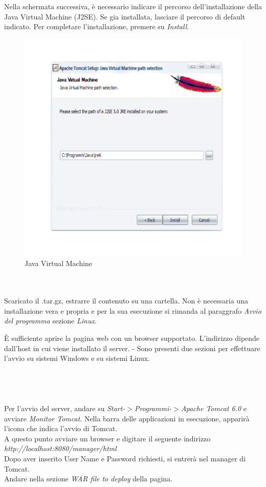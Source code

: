 Nella schermata successiva, \`e necessario indicare il percorso dell'installazione della Java Virtual Machine (J2SE). Se gia installata, lasciare il percorso di default
indicato.
Per completare l'installazione, premere su \textit{Install}.

\begin{figure}[!ht]
\centering
\includegraphics[scale=0.7]{images/InstallTomcat4.png}
\caption{Java Virtual Machine}
\end{figure} 

\\
\\
Scaricato il .tar.gz, estrarre il contenuto su una cartella.
Non \`e necessaria una installazione vera e propria e per la sua esecuzione si rimanda al paraggrafo \textit{Avvio del programma} sezione \textit{Linux}.

\`E sufficiente aprire la pagina web con un browser supportato. L'indirizzo dipende dall'host in cui viene installato il server.
-
Sono presenti due sezioni per effettuare l'avvio su sistemi Windows e su sistemi Linux.\\
\\\\
\\
\\
Per l'avvio del server, andare su \textit{Start-$ > $Programmi-$ > $Apache Tomcat 6.0} e avviare \textit{Monitor Tomcat}.
Nella barra delle applicazioni in esecuzione, apparir\`a l'icona che indica l'avvio di Tomcat.\\
A questo punto avviare un browser e digitare il seguente indirizzo\\ \textit{http://localhost:8080/manager/html}\\
Dopo aver inserito User Name e Password richiesti, si entrer\`a nel manager di Tomcat.\\
Andare nella sezione \textit{WAR file to deploy} della pagina.\\

